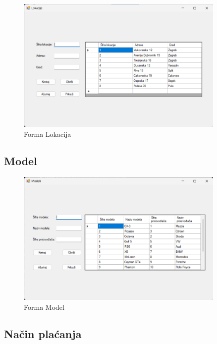 \documentclass[]{foi} %
\begin{document}
\begin{figure}[!ht]
    \centering
    \includegraphics[width=0.9\textwidth]{slike/lokacija.png}
    \caption{Forma Lokacija}
    \label{fig:lokacija}
\end{figure}

\subsection{Model}

\begin{figure}[!ht]
    \centering
    \includegraphics[width=0.9\textwidth]{slike/model.png}
    \caption{Forma Model}
    \label{fig:model}
\end{figure}
\newpage

\subsection{Način plaćanja}
\end{document}
